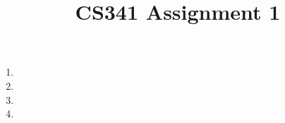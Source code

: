 \documentclass[12pt]{article}
\title{CS341 Assignment 1}
\begin{document}
\maketitle

\begin{enumerate}
\item
\item
\item
\item
\end{enumerate}
\end{document}
